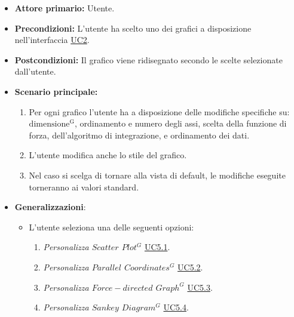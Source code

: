 \begin{itemize}
	\item \textbf{Attore primario:} Utente.
	\item \textbf{Precondizioni:} L'utente ha scelto uno dei grafici a disposizione nell'interfaccia \hyperref[sec:UC2]{UC2}.
	\item \textbf{Postcondizioni:} Il grafico viene ridisegnato secondo le scelte selezionate dall'utente.
	\item \textbf{Scenario principale:}
	\begin{enumerate}
		\item Per ogni grafico l'utente ha a disposizione delle modifiche specifiche su: ${\mathrm{dimensione^{G}}}$, ordinamento e numero degli assi, scelta della funzione di forza, dell'algoritmo di integrazione, e ordinamento dei dati.
    		\item L'utente modifica anche lo stile del grafico.
    		\item Nel caso si scelga di tornare alla vista di default, le modifiche eseguite torneranno ai valori standard.
    \end{enumerate}
    \item \textbf{Generalizzazioni}:
    \begin{itemize}
        \item L'utente seleziona una delle seguenti opzioni:
                \begin{enumerate}
                    \item \textit{Personalizza $Scatter$ $Plot^{G}$} \hyperref[sec:UC5.1]{UC5.1}.
                    \item \textit{Personalizza $Parallel$ $Coordinates^{G}$} \hyperref[sec:UC5.2]{UC5.2}.
                    \item \textit{Personalizza $Force-directed$ $Graph^{G}$} \hyperref[sec:UC5.3]{UC5.3}.
                    \item \textit{Personalizza $Sankey$ $Diagram^{G}$} \hyperref[sec:UC5.4]{UC5.4}.
                \end{enumerate}
    \end{itemize} 
\end{itemize}

\newpage
